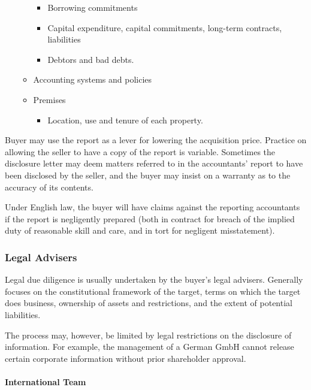 \documentclass[
]{article}
\providecommand{\tightlist}{%
  \setlength{\itemsep}{0pt}\setlength{\parskip}{0pt}}
\begin{document}
\begin{itemize}
\begin{itemize}
    \begin{itemize}
    \tightlist
    \item
      Borrowing commitments
    \item
      Capital expenditure, capital commitments, long-term contracts,
      liabilities
    \item
      Debtors and bad debts.
    \end{itemize}
  \item
    Accounting systems and policies
  \item
    Premises

    \begin{itemize}
    \tightlist
    \item
      Location, use and tenure of each property.
    \end{itemize}
  \end{itemize}
\end{itemize}

Buyer may use the report as a lever for lowering the acquisition price.
Practice on allowing the seller to have a copy of the report is
variable. Sometimes the disclosure letter may deem matters referred to
in the accountants' report to have been disclosed by the seller, and the
buyer may insist on a warranty as to the accuracy of its contents.

Under English law, the buyer will have claims against the reporting
accountants if the report is negligently prepared (both in contract for
breach of the implied duty of reasonable skill and care, and in tort for
negligent misstatement).

\hypertarget{legal-advisers}{%
\subsubsection{Legal Advisers}\label{legal-advisers}}

Legal due diligence is usually undertaken by the buyer's legal advisers.
Generally focuses on the constitutional framework of the target, terms
on which the target does business, ownership of assets and restrictions,
and the extent of potential liabilities.

The process may, however, be limited by legal restrictions on the
disclosure of information. For example, the management of a German GmbH
cannot release certain corporate information without prior shareholder
approval.

\hypertarget{international-team}{%
\paragraph{International Team}\label{international-team}}
\end{document}
